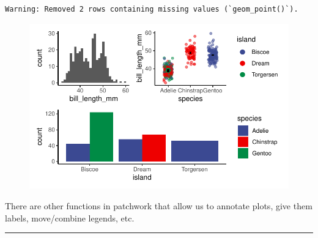 \documentclass[
  letterpaper,
  DIV=11,
  numbers=noendperiod]{scrartcl}
\begin{document}
\begin{verbatim}
Warning: Removed 2 rows containing missing values (`geom_point()`).
\end{verbatim}

\begin{figure}[H]

{\centering \includegraphics{facets_files/figure-pdf/unnamed-chunk-9-1.pdf}

}

\end{figure}

There are other functions in patchwork that allow us to annotate plots,
give them labels, move/combine legends, etc.

\begin{center}\rule{0.5\linewidth}{0.5pt}\end{center}
\end{document}
